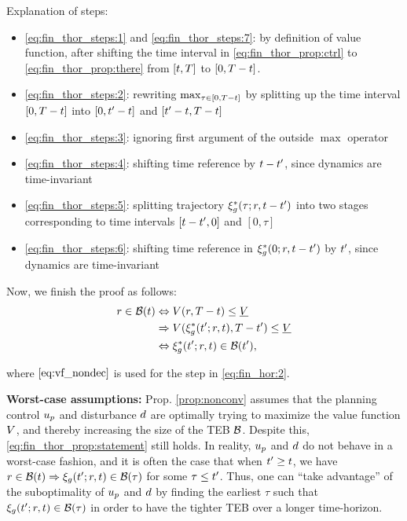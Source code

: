 \begin{IEEEproof}
Explanation of steps:
\begin{itemize}
  \item \eqref{eq:fin_thor_steps:1} and \eqref{eq:fin_thor_steps:7}: by definition of value function, after shifting the time interval in \eqref{eq:fin_thor_prop:ctrl} to \eqref{eq:fin_thor_prop:there} from $[t, T]$ to $[0, T-t]$.
  \item \eqref{eq:fin_thor_steps:2}: rewriting $\max_{\tau \in [0, T-t]}$ by splitting up the time interval $[0, T-t]$ into $[0, t'-t]$ and $[t'-t, T-t]$
  \item \eqref{eq:fin_thor_steps:3}: ignoring first argument of the outside $\max$ operator
  \item \eqref{eq:fin_thor_steps:4}: shifting time reference by $t-t'$, since dynamics are time-invariant
  \item \eqref{eq:fin_thor_steps:5}: splitting trajectory $\xi_g^*(\tau; r, t-t')$ into two stages corresponding to time intervals $[t-t', 0]$ and $[0, \tau]$
  \item \eqref{eq:fin_thor_steps:6}: shifting time reference in $\xi_g^*(0; r, t-t')$ by $t'$, since dynamics are time-invariant
\end{itemize}

Now, we finish the proof as follows:
\begin{subequations} \label{eq:fin_hor}
  \begin{align}
  \rstate \in \TEB(\tvar) &\Leftrightarrow \valfunc(\rstate, \thor - \tvar) \le \underline\valfunc \\
  & \Rightarrow  \valfunc(\rtraj^*(\tvar'; \rstate, \tvar), \thor - \tvar') \le \underline\valfunc \label{eq:fin_hor:2}\\
  & \Leftrightarrow \rtraj^*(\tvar'; \rstate, \tvar) \in \TEB(\tvar'),
  \end{align}
\end{subequations}

\noindent where $\eqref{eq:vf_nondec}$ is used for the step in \eqref{eq:fin_hor:2}.

\end{IEEEproof} 

\begin{rem}
  \textbf{Worst-case assumptions:} Prop. \ref{prop:nonconv} assumes that the planning control $u_p$ and disturbance $d$ are optimally trying to maximize the value function $V$, and thereby increasing the size of the TEB $\mathcal B$.
  Despite this, \eqref{eq:fin_thor_prop:statement} still holds.
  In reality, $u_p$ and $d$ do not behave in a worst-case fashion, and it is often the case that when $t' \ge t$, we have $r \in \mathcal B(t) \Rightarrow \xi_g(t'; r, t) \in \mathcal B(\tau)$ for some $\tau \le t'$.
  Thus, one can ``take advantage'' of the suboptimality of $u_p$ and $d$ by finding the earliest $\tau$ such that $\xi_g(t'; r, t) \in \mathcal B(\tau)$ in order to have the tighter TEB over a longer time-horizon.
\end{rem}

